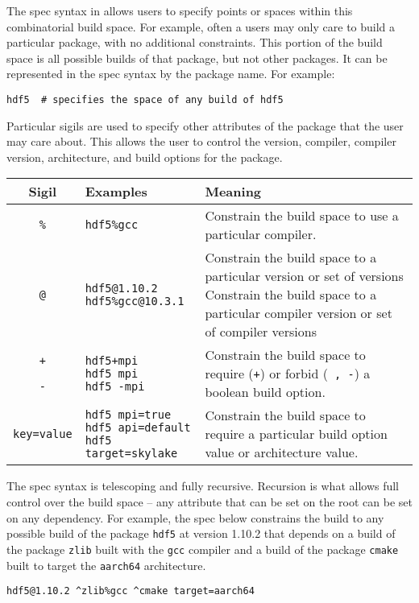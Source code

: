 The spec syntax in \spack{} allows users to specify points or spaces within this combinatorial build space. For example, often a users may only care to build a particular package, with no additional constraints. This portion of the build space is all possible builds of that package, but not other packages. It can be represented in the spec syntax by the package name. For example:
\begin{verbatim}
hdf5  # specifies the space of any build of hdf5
\end{verbatim}
Particular sigils are used to specify other attributes of the package that the user may care about. This allows the user to control the version, compiler, compiler version, architecture, and build options for the package.
\begin{tabular}{cll}
\hline
Sigil & Examples & Meaning \\
\hline
\texttt{\%} & \texttt{hdf5\%gcc} & Constrain the build space to use a particular compiler. \\
\hline
\texttt{@} & \shortstack{\texttt{hdf5@1.10.2} \\ \texttt{hdf5\%gcc@10.3.1}} & \shortstack{Constrain the build space to a particular version or set of versions \\ Constrain the build space to a particular compiler version or set of compiler versions} \\
\hline
\shortstack{\texttt{+} \\ \texttt{~} \\ \texttt{-}} & \shortstack{\texttt{hdf5+mpi} \\ \texttt{hdf5~mpi} \\ \texttt{hdf5 -mpi}} & Constrain the build space to require (\texttt{+}) or forbid (\texttt{~, -}) a boolean build option. \\
\hline
\texttt{key=value} & \shortstack{\texttt{hdf5 mpi=true} \\ \texttt{hdf5 api=default} \\ \texttt{hdf5 target=skylake}} & Constrain the build space to require a particular build option value or architecture value. \\
\end{tabular}


The spec syntax is telescoping and fully recursive. Recursion is what allows full control over the build space -- any attribute that can be set on the root can be set on any dependency. For example, the spec below constrains the build to any possible build of the package \texttt{hdf5} at version 1.10.2 that depends on a build of the package \texttt{zlib} built with the \texttt{gcc} compiler and a build of the package \texttt{cmake} built to target the \texttt{aarch64} architecture.
\begin{verbatim}
hdf5@1.10.2 ^zlib%gcc ^cmake target=aarch64
\end{verbatim}

